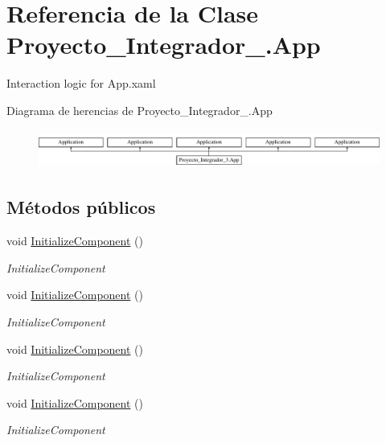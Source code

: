 \hypertarget{class_proyecto___integrador__3_1_1_app}{\section{Referencia de la Clase Proyecto\-\_\-\-Integrador\-\_.\-App}
\label{class_proyecto___integrador__3_1_1_app}
}


Interaction logic for App.\-xaml  


Diagrama de herencias de Proyecto\-\_\-\-Integrador\-\_.\-App\begin{figure}[H]
\begin{center}
\leavevmode
\includegraphics[height=1.265537cm]{da/db0/class_proyecto___integrador__3_1_1_app}
\end{center}
\end{figure}
\subsection*{Métodos públicos}
\begin{DoxyCompactItemize}
\item 
void \hyperlink{class_proyecto___integrador__3_1_1_app_a643a6ed9d7f0be6f862cd033ec749ec0}{Initialize\-Component} ()
\begin{DoxyCompactList}\small\item\em Initialize\-Component \end{DoxyCompactList}\item 
void \hyperlink{class_proyecto___integrador__3_1_1_app_a643a6ed9d7f0be6f862cd033ec749ec0}{Initialize\-Component} ()
\begin{DoxyCompactList}\small\item\em Initialize\-Component \end{DoxyCompactList}\item 
void \hyperlink{class_proyecto___integrador__3_1_1_app_a643a6ed9d7f0be6f862cd033ec749ec0}{Initialize\-Component} ()
\begin{DoxyCompactList}\small\item\em Initialize\-Component \end{DoxyCompactList}\item 
void \hyperlink{class_proyecto___integrador__3_1_1_app_a643a6ed9d7f0be6f862cd033ec749ec0}{Initialize\-Component} ()
\begin{DoxyCompactList}\small\item\em Initialize\-Component \end{DoxyCompactList}\end{DoxyCompactItemize}
